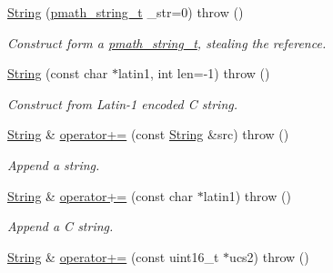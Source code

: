 \begin{CompactItemize}
\item 
\hypertarget{classpmath_1_1_string_4d5b86695cf23c908dac023111c72850}{
\hyperlink{classpmath_1_1_string_4d5b86695cf23c908dac023111c72850}{String} (\hyperlink{classpmath__string__t}{pmath\_\-string\_\-t} \_\-str=0)  throw ()}
\label{classpmath_1_1_string_4d5b86695cf23c908dac023111c72850}

\begin{CompactList}\small\item\em Construct form a \hyperlink{classpmath__string__t}{pmath\_\-string\_\-t}, stealing the reference. \item\end{CompactList}\item 
\hypertarget{classpmath_1_1_string_97ff7e31aa0b34685596e2b4a2cf55a5}{
\hyperlink{classpmath_1_1_string_97ff7e31aa0b34685596e2b4a2cf55a5}{String} (const char $\ast$latin1, int len=-1)  throw ()}
\label{classpmath_1_1_string_97ff7e31aa0b34685596e2b4a2cf55a5}

\begin{CompactList}\small\item\em Construct from Latin-1 encoded C string. \item\end{CompactList}\item 
\hypertarget{classpmath_1_1_string_c0968719ace20b80cfa8240cff7e5824}{
\hyperlink{classpmath_1_1_string}{String} \& \hyperlink{classpmath_1_1_string_c0968719ace20b80cfa8240cff7e5824}{operator+=} (const \hyperlink{classpmath_1_1_string}{String} \&src)  throw ()}
\label{classpmath_1_1_string_c0968719ace20b80cfa8240cff7e5824}

\begin{CompactList}\small\item\em Append a string. \item\end{CompactList}\item 
\hypertarget{classpmath_1_1_string_1c7b3d4111c19800eb326dfec0adc194}{
\hyperlink{classpmath_1_1_string}{String} \& \hyperlink{classpmath_1_1_string_1c7b3d4111c19800eb326dfec0adc194}{operator+=} (const char $\ast$latin1)  throw ()}
\label{classpmath_1_1_string_1c7b3d4111c19800eb326dfec0adc194}

\begin{CompactList}\small\item\em Append a C string. \item\end{CompactList}\item 
\hypertarget{classpmath_1_1_string_eb4ee13138e4b79d72d6137c76eeaa40}{
\hyperlink{classpmath_1_1_string}{String} \& \hyperlink{classpmath_1_1_string_eb4ee13138e4b79d72d6137c76eeaa40}{operator+=} (const uint16\_\-t $\ast$ucs2)  throw ()}
\label{classpmath_1_1_string_eb4ee13138e4b79d72d6137c76eeaa40}


\end{CompactItemize}
